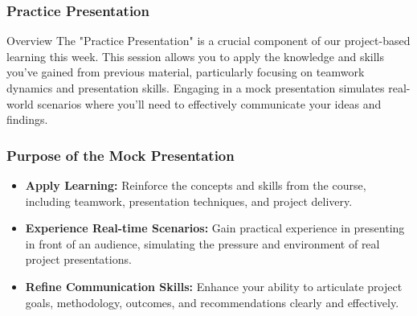\documentclass[aspectratio=169]{beamer}
\begin{document}
\begin{frame}[fragile]
    \frametitle{Practice Presentation}
    \begin{block}{Overview}
        The "Practice Presentation" is a crucial component of our project-based learning this week. This session allows you to apply the knowledge and skills you've gained from previous material, particularly focusing on teamwork dynamics and presentation skills. Engaging in a mock presentation simulates real-world scenarios where you'll need to effectively communicate your ideas and findings.
    \end{block}
\end{frame}

\begin{frame}[fragile]
    \frametitle{Purpose of the Mock Presentation}
    \begin{itemize}
        \item \textbf{Apply Learning:} Reinforce the concepts and skills from the course, including teamwork, presentation techniques, and project delivery.
        \item \textbf{Experience Real-time Scenarios:} Gain practical experience in presenting in front of an audience, simulating the pressure and environment of real project presentations.
        \item \textbf{Refine Communication Skills:} Enhance your ability to articulate project goals, methodology, outcomes, and recommendations clearly and effectively.
    \end{itemize}
\end{frame}
\end{document}
